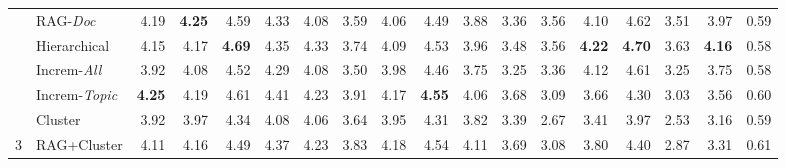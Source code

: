 \begin{table*}[]
\begin{tabular}{@{}clrrrrrrrrrrrrrrrc@{}}
 & \multicolumn{1}{l|}{RAG-\textit{Doc}} & \cellcolor[HTML]{DAE8FC}4.19 & \cellcolor[HTML]{DAE8FC}\textbf{4.25} & \cellcolor[HTML]{DAE8FC}4.59 & \cellcolor[HTML]{DAE8FC}4.33 & \multicolumn{1}{r|}{4.08} & 3.59 & 4.06 & \cellcolor[HTML]{DAE8FC}4.49 & 3.88 & \multicolumn{1}{r|}{3.36} & \cellcolor[HTML]{DAE8FC}3.56 & \cellcolor[HTML]{DAE8FC}4.10 & \cellcolor[HTML]{DAE8FC}4.62 & \cellcolor[HTML]{DAE8FC}3.51 & \multicolumn{1}{r|}{\cellcolor[HTML]{DAE8FC}3.97} & 0.59 \\
 & \multicolumn{1}{l|}{Hierarchical} & \cellcolor[HTML]{DAE8FC}4.15 & \cellcolor[HTML]{DAE8FC}4.17 & \cellcolor[HTML]{DAE8FC}\textbf{4.69} & \cellcolor[HTML]{DAE8FC}4.35 & \multicolumn{1}{r|}{\cellcolor[HTML]{DAE8FC}4.33} & 3.74 & 4.09 & \cellcolor[HTML]{DAE8FC}4.53 & 3.96 & \multicolumn{1}{r|}{3.48} & \cellcolor[HTML]{DAE8FC}3.56 & \cellcolor[HTML]{DAE8FC}\textbf{4.22} & \cellcolor[HTML]{DAE8FC}\textbf{4.70} & \cellcolor[HTML]{DAE8FC}3.63 & \multicolumn{1}{r|}{\cellcolor[HTML]{DAE8FC}\textbf{4.16}} & 0.58 \\
 & \multicolumn{1}{l|}{Increm-\textit{All}} & 3.92 & 4.08 & 4.52 & \cellcolor[HTML]{DAE8FC}4.29 & \multicolumn{1}{r|}{4.08} & 3.50 & 3.98 & \cellcolor[HTML]{DAE8FC}4.46 & 3.75 & \multicolumn{1}{r|}{3.25} & \cellcolor[HTML]{DAE8FC}3.36 & \cellcolor[HTML]{DAE8FC}4.12 & \cellcolor[HTML]{DAE8FC}4.61 & 3.25 & \multicolumn{1}{r|}{3.75} & 0.58 \\
 & \multicolumn{1}{l|}{Increm-\textit{Topic}} & \cellcolor[HTML]{DAE8FC}\textbf{4.25} & \cellcolor[HTML]{DAE8FC}4.19 & \cellcolor[HTML]{DAE8FC}4.61 & \cellcolor[HTML]{DAE8FC}4.41 & \multicolumn{1}{r|}{\cellcolor[HTML]{DAE8FC}4.23} & \cellcolor[HTML]{DAE8FC}3.91 & \cellcolor[HTML]{DAE8FC}4.17 & \cellcolor[HTML]{DAE8FC}\textbf{4.55} & \cellcolor[HTML]{DAE8FC}4.06 & \multicolumn{1}{r|}{\cellcolor[HTML]{DAE8FC}3.68} & 3.09 & 3.66 & 4.30 & 3.03 & \multicolumn{1}{r|}{3.56} & 0.60 \\
 & \multicolumn{1}{l|}{Cluster} & 3.92 & 3.97 & 4.34 & 4.08 & \multicolumn{1}{r|}{4.06} & 3.64 & 3.95 & 4.31 & 3.82 & \multicolumn{1}{r|}{3.39} & 2.67 & 3.41 & 3.97 & 2.53 & \multicolumn{1}{r|}{3.16} & 0.59 \\
\multirow{-10}{*}{3} & \multicolumn{1}{l|}{RAG+Cluster} & \cellcolor[HTML]{DAE8FC}4.11 & \cellcolor[HTML]{DAE8FC}4.16 & 4.49 & \cellcolor[HTML]{DAE8FC}4.37 & \multicolumn{1}{r|}{\cellcolor[HTML]{DAE8FC}4.23} & \cellcolor[HTML]{DAE8FC}3.83 & \cellcolor[HTML]{DAE8FC}4.18 & \cellcolor[HTML]{DAE8FC}4.54 & \cellcolor[HTML]{DAE8FC}4.11 & \multicolumn{1}{r|}{\cellcolor[HTML]{DAE8FC}3.69} & 3.08 & 3.80 & 4.40 & 2.87 & \multicolumn{1}{r|}{3.31} & 0.61 \\ \midrule

\end{tabular}
\end{table*}
